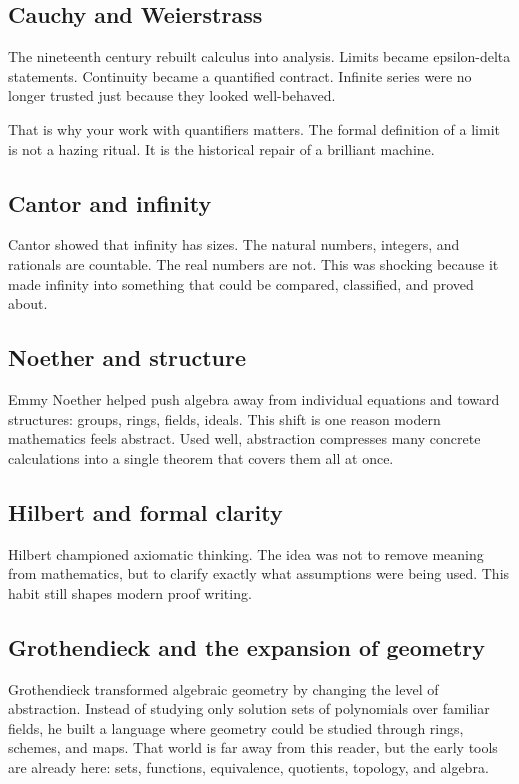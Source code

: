 \documentclass[11pt]{article}
\begin{document}
\subsection{Cauchy and Weierstrass}

The nineteenth century rebuilt calculus into analysis. Limits became epsilon-delta statements. Continuity became a quantified contract. Infinite series were no longer trusted just because they looked well-behaved.

That is why your work with quantifiers matters. The formal definition of a limit is not a hazing ritual. It is the historical repair of a brilliant machine.

\subsection{Cantor and infinity}

Cantor showed that infinity has sizes. The natural numbers, integers, and rationals are countable. The real numbers are not. This was shocking because it made infinity into something that could be compared, classified, and proved about.

\subsection{Noether and structure}

Emmy Noether helped push algebra away from individual equations and toward structures: groups, rings, fields, ideals. This shift is one reason modern mathematics feels abstract. Used well, abstraction compresses many concrete calculations into a single theorem that covers them all at once.

\subsection{Hilbert and formal clarity}

Hilbert championed axiomatic thinking. The idea was not to remove meaning from mathematics, but to clarify exactly what assumptions were being used. This habit still shapes modern proof writing.

\subsection{Grothendieck and the expansion of geometry}

Grothendieck transformed algebraic geometry by changing the level of abstraction. Instead of studying only solution sets of polynomials over familiar fields, he built a language where geometry could be studied through rings, schemes, and maps. That world is far away from this reader, but the early tools are already here: sets, functions, equivalence, quotients, topology, and algebra.
\end{document}
